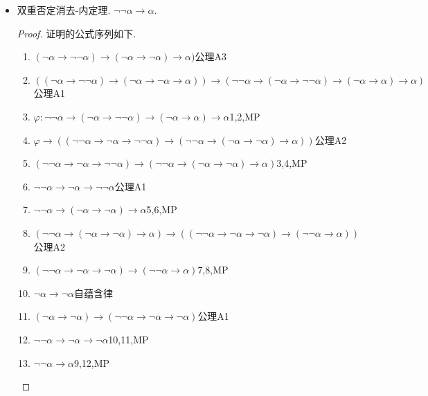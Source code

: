\begin{itemize}
    \item 双重否定消去-内定理. \(\neg \neg \alpha \to \alpha\).
    \begin{proof}
        证明的公式序列如下.
        \begin{enumerate}
            \item \((\neg \alpha \to \neg \neg \alpha) \to (\neg \alpha \to \neg \alpha) \to \alpha)\)\hfill 公理A3 
            \item \(((\neg \alpha \to \neg \neg \alpha) \to (\neg \alpha \to \neg \alpha \to \alpha)) \to (\neg \neg \alpha \to (\neg \alpha \to \neg \neg \alpha) \to (\neg \alpha \to \alpha) \to \alpha)\)\hfill 公理A1 
            \item \(\varphi: \neg \neg \alpha \to (\neg \alpha \to \neg \neg \alpha) \to (\neg \alpha \to \alpha) \to \alpha\)\hfill 1,2,MP 
            \item \(\varphi \to ((\neg \neg \alpha \to \neg \alpha \to \neg \neg \alpha) \to (\neg \neg \alpha \to (\neg \alpha \to \neg \alpha) \to \alpha))\)\hfill 公理A2 
            \item \((\neg \neg \alpha \to \neg \alpha \to \neg \neg \alpha) \to (\neg \neg \alpha \to (\neg \alpha \to \neg \alpha) \to \alpha)\)\hfill 3,4,MP 
            \item \(\neg \neg \alpha \to \neg \alpha \to \neg \neg \alpha\)\hfill 公理A1 
            \item \(\neg \neg \alpha \to (\neg \alpha \to \neg \alpha) \to \alpha\)\hfill 5,6,MP 
            \item \((\neg \neg \alpha \to (\neg \alpha \to \neg \alpha) \to \alpha) \to ((\neg \neg \alpha \to \neg \alpha \to \neg \alpha) \to (\neg \neg \alpha \to \alpha))\)\hfill 公理A2 
            \item \((\neg \neg \alpha \to \neg \alpha \to \neg \alpha) \to (\neg \neg \alpha \to \alpha)\)\hfill 7,8,MP 
            \item \(\neg \alpha \to \neg \alpha\)\hfill 自蕴含律 
            \item \((\neg \alpha \to \neg \alpha) \to (\neg \neg \alpha \to \neg \alpha \to \neg \alpha)\)\hfill 公理A1 
            \item \(\neg \neg \alpha \to \neg \alpha \to \neg \alpha\)\hfill 10,11,MP 
            \item \(\neg \neg \alpha \to \alpha\)\hfill 9,12,MP 
         \end{enumerate}
    \end{proof}


\end{itemize}
